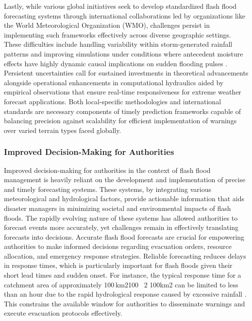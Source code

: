 Lastly, while various global initiatives seek to develop standardized flash flood forecasting systems through international collaborations led by organizations like the World Meteorological Organization (WMO), challenges persist in implementing such frameworks effectively across diverse geographic settings. These difficulties include handling variability within storm-generated rainfall patterns and improving simulations under conditions where antecedent moisture effects have highly dynamic causal implications on sudden flooding pulses \citep{Buzgaru2021}\citep{Msigwa2024}. Persistent uncertainties call for sustained investments in theoretical advancements alongside operational enhancements in computational hydraulics aided by empirical observations that ensure real-time responsiveness for extreme weather forecast applications. Both local-specific methodologies and international standards are necessary components of timely prediction frameworks capable of balancing precision against scalability for efficient implementation of warnings over varied terrain types faced globally.


\subsubsection{Improved Decision-Making for Authorities}
Improved decision-making for authorities in the context of flash flood management is heavily reliant on the development and implementation of precise and timely forecasting systems. These systems, by integrating various meteorological and hydrological factors, provide actionable information that aids disaster managers in minimizing societal and environmental impacts of flash floods. The rapidly evolving nature of these systems has allowed authorities to forecast events more accurately, yet challenges remain in effectively translating forecasts into decisions. Accurate flash flood forecasts are crucial for empowering authorities to make informed decisions regarding evacuation orders, resource allocation, and emergency response strategies. Reliable forecasting reduces delays in response times, which is particularly important for flash floods given their short lead times and sudden onset. For instance, the typical response time for a catchment area of approximately 100 km2100 \, 2
100km2 can be limited to less than an hour due to the rapid hydrological response caused by excessive rainfall \citep{Maqtan2022b}\citep{Maqtan2022a}. This constrains the available window for authorities to disseminate warnings and execute evacuation protocols effectively.

